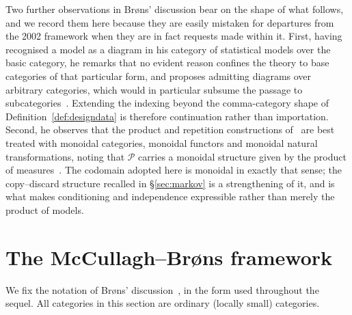 \documentclass[11pt,a4paper]{article}
\theoremstyle{plain}
\theoremstyle{definition}
\theoremstyle{remark}
\newcommand{\Prb}{\mathcal{P}}
\begin{document}
Two further observations in Br\o ns' discussion bear on the shape of what
follows, and we record them here because they are easily mistaken for
departures from the 2002 framework when they are in fact requests made within
it. First, having recognised a model as a diagram in his category of
statistical models over the basic category, he remarks that no evident reason
confines the theory to base categories of that particular form, and proposes
admitting diagrams over arbitrary categories, which would in particular
subsume the passage to subcategories~\cite[p.~1282]{brons_discussion_2002}.
Extending the indexing beyond the comma-category shape of
Definition~\ref{def:designdata} is therefore continuation rather than
importation. Second, he observes that the product and repetition
constructions of~\cite{mccullagh_what_2002} are best treated with monoidal
categories, monoidal functors and monoidal natural transformations, noting
that $\Prb$ carries a monoidal structure given by the product of
measures~\cite[pp.~1282--1283]{brons_discussion_2002}. The codomain adopted
here is monoidal in exactly that sense; the copy--discard structure recalled
in \S\ref{sec:markov} is a strengthening of it, and is what makes conditioning
and independence expressible rather than merely the product of models.

\section{The McCullagh--Br\o ns framework}\label{sec:mcb}

We fix the notation of Br\o ns' discussion~\cite{brons_discussion_2002}, in the form used
throughout the sequel. All categories in this section are ordinary (locally
small) categories.
\end{document}
